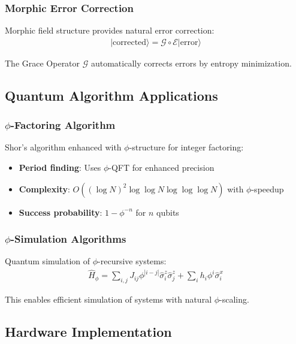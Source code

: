 \subsubsection{Morphic Error Correction}

Morphic field structure provides natural error correction:
\begin{align}
|\text{corrected}\rangle = \mathcal{G} \circ \mathcal{E} |\text{error}\rangle
\end{align}

The Grace Operator $\mathcal{G}$ automatically corrects errors by entropy minimization.

\subsection{Quantum Algorithm Applications}

\subsubsection{$\phi$-Factoring Algorithm}

Shor's algorithm enhanced with $\phi$-structure for integer factoring:
\begin{itemize}
    \item \textbf{Period finding}: Uses $\phi$-QFT for enhanced precision
    \item \textbf{Complexity}: $O((\log N)^2 \log\log N \log\log\log N)$ with $\phi$-speedup
    \item \textbf{Success probability}: $1 - \phi^{-n}$ for $n$ qubits
\end{itemize}

\subsubsection{$\phi$-Simulation Algorithms}

Quantum simulation of $\phi$-recursive systems:
\begin{align}
\hat{H}_\phi = \sum_{i,j} J_{ij} \phi^{|i-j|} \hat{\sigma}_i^z \hat{\sigma}_j^z + \sum_i h_i \phi^i \hat{\sigma}_i^x
\end{align}

This enables efficient simulation of systems with natural $\phi$-scaling.

\subsection{Hardware Implementation}

